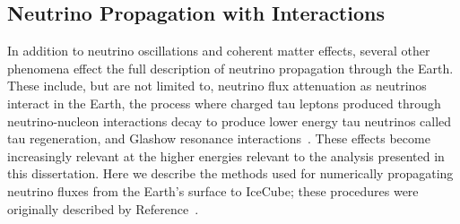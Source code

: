 \documentclass[main.tex]{subfiles}
\begin{document}
\subsection{Neutrino Propagation with Interactions}
In addition to neutrino oscillations and coherent matter effects, several other phenomena effect the full description of neutrino propagation through the Earth. 
These include, but are not limited to, neutrino flux attenuation as neutrinos interact in the Earth, the process where charged tau leptons produced through neutrino-nucleon interactions decay to produce lower energy tau neutrinos called tau regeneration, and Glashow resonance interactions~\cite{PhysRev.118.316}.
These effects become increasingly relevant at the higher energies relevant to the analysis presented in this dissertation.  
Here we describe the methods used for numerically propagating neutrino fluxes from the Earth's surface to IceCube; these procedures were originally described by Reference~\cite{arguelles2021nusquids}.
\end{document}

